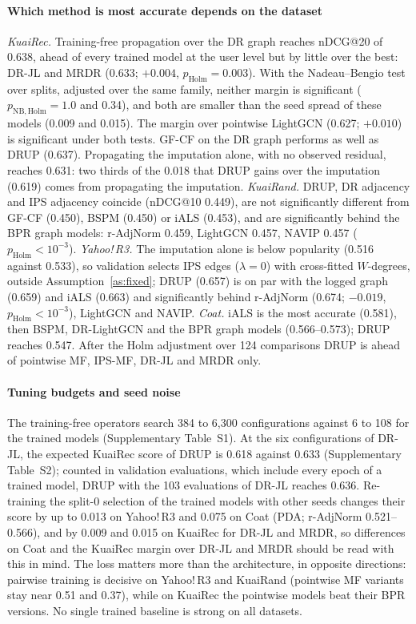 \documentclass[preprint,review,12pt,authoryear]{elsarticle}
\theoremstyle{definition}
\begin{document}
\paragraph{Which method is most accurate depends on the dataset}
\emph{KuaiRec.} Training-free propagation over the DR graph reaches nDCG@20 of 0.638,
ahead of every trained model at the user level but by little over the best: DR-JL and
MRDR (0.633; $+0.004$, $p_{\mathrm{Holm}}=0.003$). With the Nadeau--Bengio test over
splits, adjusted over the same family, neither margin is significant
($p_{\mathrm{NB,Holm}}=1.0$ and 0.34), and both are smaller than the seed spread of these
models (0.009 and 0.015). The margin over pointwise LightGCN (0.627; $+0.010$) is
significant under both tests. GF-CF on the DR graph performs as well as DRUP (0.637).
Propagating the imputation alone, with no observed residual, reaches 0.631: two thirds of
the 0.018 that DRUP gains over the imputation (0.619) comes from propagating the
imputation. \emph{KuaiRand.} DRUP, DR adjacency and IPS adjacency coincide (nDCG@10 0.449),
are not significantly different from GF-CF (0.450), BSPM (0.450) or iALS (0.453), and are
significantly behind the BPR graph models: r-AdjNorm 0.459, LightGCN 0.457, NAVIP 0.457
($p_{\mathrm{Holm}}<10^{-3}$). \emph{Yahoo!\,R3.} The imputation alone is below popularity
(0.516 against 0.533), so validation selects IPS edges ($\lambda=0$) with cross-fitted
$W$-degrees, outside Assumption~\ref{as:fixed}; DRUP (0.657) is on par with the logged
graph (0.659) and iALS (0.663) and significantly behind r-AdjNorm (0.674; $-0.019$,
$p_{\mathrm{Holm}}<10^{-3}$), LightGCN and NAVIP. \emph{Coat.} iALS is the most accurate
(0.581), then BSPM, DR-LightGCN and the BPR graph models (0.566--0.573); DRUP reaches 0.547.
After the Holm adjustment over 124 comparisons DRUP is ahead of pointwise MF, IPS-MF,
DR-JL and MRDR only.

\paragraph{Tuning budgets and seed noise} The training-free operators search 384 to
6{,}300 configurations against 6 to 108 for the trained models (Supplementary Table~S1). At the six configurations of DR-JL, the expected KuaiRec score of
DRUP is 0.618 against 0.633 (Supplementary Table~S2); counted in validation
evaluations, which include every epoch of a trained model, DRUP with the 103 evaluations
of DR-JL reaches 0.636. Re-training the split-0 selection of the trained models with other
seeds changes their score by up to 0.013 on Yahoo!\,R3 and 0.075 on Coat (PDA; r-AdjNorm
0.521--0.566), and by 0.009 and 0.015 on KuaiRec for DR-JL and MRDR, so differences on
Coat and the KuaiRec margin over DR-JL and MRDR should be read with this in mind. The loss
matters more than the architecture, in opposite directions: pairwise training is decisive
on Yahoo!\,R3 and KuaiRand (pointwise MF variants stay near 0.51 and 0.37), while on
KuaiRec the pointwise models beat their BPR versions. No single trained baseline is strong
on all datasets.
\end{document}
